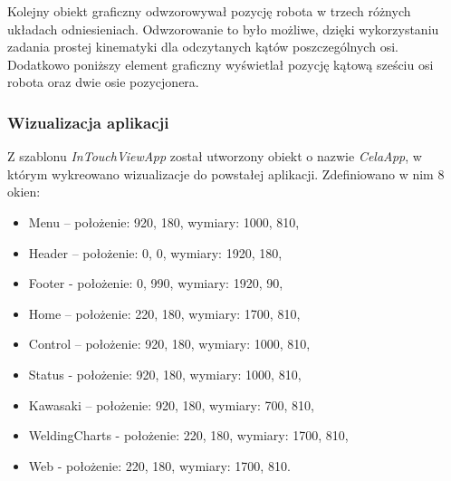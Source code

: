 
Kolejny obiekt graficzny odwzorowywał pozycję robota w trzech różnych układach odniesieniach. Odwzorowanie to było możliwe, dzięki wykorzystaniu zadania prostej kinematyki dla odczytanych kątów poszczególnych osi. Dodatkowo poniższy element graficzny wyświetlał pozycję kątową sześciu osi robota oraz dwie osie pozycjonera.


\subsubsection{Wizualizacja aplikacji}

Z szablonu \textit{InTouchViewApp} został utworzony obiekt o nazwie \textit{CelaApp}, w którym wykreowano wizualizacje do powstałej aplikacji. Zdefiniowano w nim 8 okien:

\begin{itemize}
	\item	Menu – położenie: 920, 180, wymiary: 1000, 810,
	\item	Header – położenie: 0, 0, wymiary: 1920, 180,
	\item	Footer - położenie: 0, 990, wymiary: 1920, 90,
	\item	Home – położenie: 220, 180, wymiary: 1700, 810,
	\item	Control – położenie: 920, 180, wymiary: 1000, 810,
	\item	Status - położenie: 920, 180, wymiary: 1000, 810,
	\item	Kawasaki – położenie: 920, 180, wymiary: 700, 810,
	\item	WeldingCharts - położenie: 220, 180, wymiary: 1700, 810,
	\item	Web - położenie: 220, 180, wymiary: 1700, 810.
\end{itemize}

